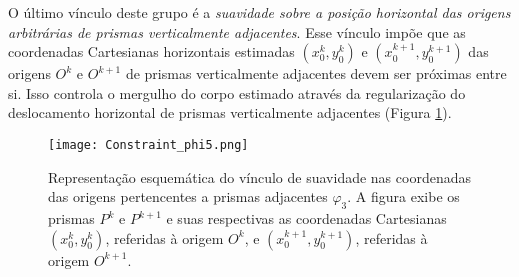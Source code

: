 O último vínculo deste grupo é a \textit{suavidade sobre a posição horizontal das origens arbitrárias de prismas verticalmente adjacentes}. Esse vínculo impõe que as coordenadas Cartesianas horizontais estimadas $(x_{0}^{k}, y_{0}^{k})$ e $(x_{0}^{k+1}, y_{0}^{k+1})$ das origens $O^{k}$ e $O^{k+1}$ 
de prismas verticalmente adjacentes devem ser próximas entre si. Isso controla o mergulho do corpo estimado através da regularização do deslocamento horizontal de prismas verticalmente adjacentes (Figura \ref{fig:phi3}).

\begin{figure}[!htb]
	\centering
	\texttt{[image: Constraint\_phi5.png]}
	\caption{Representação esquemática do vínculo de suavidade nas coordenadas das origens pertencentes a prismas adjacentes $\varphi_{3}$. A figura exibe os prismas $P^k$ e $P^{k+1}$ e suas respectivas as coordenadas Cartesianas $(x_0^k,y_0^k)$, referidas à origem $O^k$, e $(x_0^{k+1},y_0^{k+1})$, referidas à origem $O^{k+1}$.}
	\label{fig:phi3}
\end{figure}

